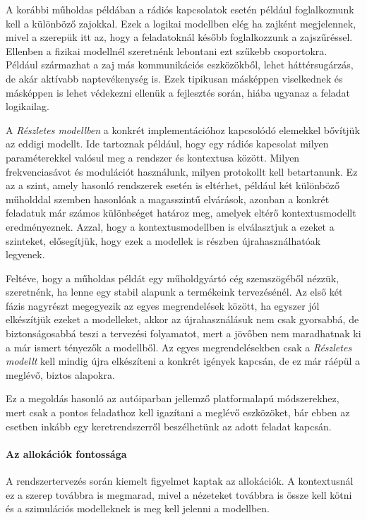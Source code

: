             A korábbi műholdas példában a rádiós kapcsolatok esetén például foglalkoznunk kell a különböző zajokkal.
            Ezek a logikai modellben elég ha zajként megjelennek, mivel a szerepük itt az, hogy a feladatoknál később foglalkozzunk a zajszűréssel.
            Ellenben a fizikai modellnél szeretnénk lebontani ezt szűkebb csoportokra. Például származhat a zaj más kommunikációs eszközökből, lehet háttérsugárzás, de akár aktívabb naptevékenység is. Ezek tipikusan másképpen viselkednek és másképpen is lehet védekezni ellenük a fejlesztés során, hiába ugyanaz a feladat logikailag.

            A \emph{Részletes modellben} a konkrét implementációhoz kapcsolódó elemekkel bővítjük az eddigi modellt. Ide tartoznak például, hogy egy rádiós kapcsolat milyen paraméterekkel valósul meg a rendszer és kontextusa között.
            Milyen frekvenciasávot és modulációt használunk, milyen protokollt kell betartanunk. Ez az a szint, amely hasonló rendszerek esetén is eltérhet, például két különböző műholddal szemben hasonlóak a magasszintű elvárások, azonban a konkrét feladatuk már számos különbséget határoz meg, amelyek eltérő kontextusmodellt eredményeznek.
            Azzal, hogy a kontextusmodellben is elválasztjuk a ezeket a szinteket, elősegítjük, hogy ezek a modellek is részben újrahasználhatóak legyenek.

            Feltéve, hogy a műholdas példát egy műholdgyártó cég szemszögéből nézzük, szeretnénk, ha lenne egy stabil alapunk a termékeink tervezésénél. Az első két fázis nagyrészt megegyezik az egyes megrendelések között, ha egyszer jól elkészítjük ezeket a modelleket, akkor az újrahasználásuk nem csak gyorsabbá, de biztonságosabbá teszi a tervezési folyamatot, mert a jövőben nem maradhatnak ki a már ismert tényezők a modellből.
            Az egyes megrendelésekben csak a \emph{Részletes modellt} kell mindig újra elkészíteni a konkrét igények kapcsán, de ez már ráépül a meglévő, biztos alapokra.
            
            Ez a megoldás hasonló az autóiparban jellemző platformalapú módszerekhez, mert csak a pontos feladathoz kell igazítani a meglévő eszközöket, bár ebben az esetben inkább egy keretrendszerről beszélhetünk az adott feladat kapcsán.
            
            \paragraph{Az allokációk fontossága}
            A rendszertervezés során kiemelt figyelmet kaptak az allokációk. A kontextusnál ez a szerep továbbra is megmarad, mivel a nézeteket továbbra is össze kell kötni és a szimulációs modelleknek is meg kell jelenni a modellben.

